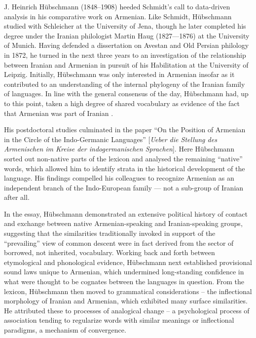 \documentclass[output=paper]{langscibook}
\begin{document}
J. Heinrich Hübschmann (1848--1908) heeded Schmidt's call to data-driven analysis in his comparative work on Armenian. Like Schmidt, Hübschmann studied with Schleicher at the University of Jena, though he later completed his degree under the Iranian philologist Martin Haug (1827—1876) at the University of Munich. Having defended a dissertation on Avestan and Old Persian philology in 1872, he turned in the next three years to an investigation of the relationship between Iranian and Armenian in pursuit of his Habilitation at the University of Leipzig. Initially, Hübschmann was only interested in Armenian insofar as it contributed to an understanding of the internal phylogeny of the Iranian family of languages. In line with the general consensus of the day, Hübschmann had, up to this point, taken a high degree of shared vocabulary as evidence of the fact that Armenian was part of Iranian \citep{Schmitt1976}.

His postdoctoral studies culminated in the \citeyear{Huebschmann1875} paper ``On the Position of Armenian in the Circle of the Indo-Germanic Languages'' [\emph{Ueber die Stellung des Armenischen im Kreise der indogermanischen Sprachen}]. Here Hübschmann sorted out non-native parts of the lexicon and analysed the remaining ``native'' words, which allowed him to identify strata in the historical development of the language. His findings compelled his colleagues to recognize Armenian as an independent branch of the Indo-European family — not a sub-group of Iranian after all.

In the \citeyear{Huebschmann1875} essay, Hübschmann demonstrated an extensive political history of contact and exchange between native Armenian-speaking and Iranian-speaking groups, suggesting that the similarities traditionally invoked in support of the ``prevailing'' view of common descent were in fact derived from the sector of borrowed, not inherited, vocabulary. Working back and forth between etymological and phonological evidence, Hübschmann next established provisional sound laws unique to Armenian, which undermined long-standing confidence in what were thought to be cognates between the languages in question. From the lexicon, Hübschmann then moved to grammatical considerations -- the inflectional morphology of Iranian and Armenian, which exhibited many surface similarities. He attributed these to processes of analogical change -- a psychological process of association tending to regularize words with similar meanings or inflectional paradigms, a mechanism of convergence.
\end{document}
